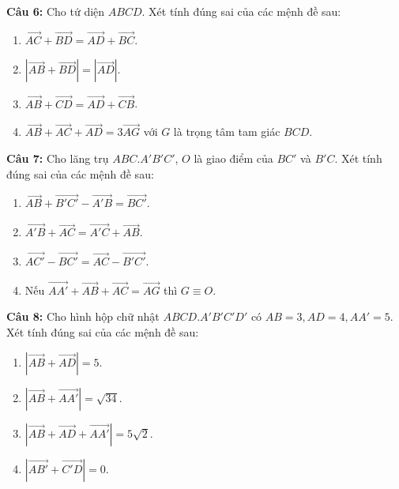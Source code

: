 \documentclass[12pt]{article}
\begin{document}
	\vspace{0.2cm}
	\noindent \textbf{Câu 6:} Cho tứ diện $ABCD$. Xét tính đúng sai của các mệnh đề sau:
	\begin{enumerate}[label=\alph*)]
		\item $\overrightarrow{AC} + \overrightarrow{BD} = \overrightarrow{AD} + \overrightarrow{BC}$.
		\item $|\overrightarrow{AB} + \overrightarrow{BD}| = |\overrightarrow{AD}|$.
		\item $\overrightarrow{AB} + \overrightarrow{CD} = \overrightarrow{AD} + \overrightarrow{CB}$.
		\item $\overrightarrow{AB} + \overrightarrow{AC} + \overrightarrow{AD} = 3\overrightarrow{AG}$ với $G$ là trọng tâm tam giác $BCD$.
	\end{enumerate}
	
	\vspace{0.2cm}
	\noindent \textbf{Câu 7:} Cho lăng trụ $ABC.A'B'C'$, $O$ là giao điểm của $BC'$ và $B'C$. Xét tính đúng sai của các mệnh đề sau:
	\begin{enumerate}[label=\alph*)]
		\item $\overrightarrow{AB} + \overrightarrow{B'C'} - \overrightarrow{A'B} = \overrightarrow{BC'}$.
		\item $\overrightarrow{A'B} + \overrightarrow{AC} = \overrightarrow{A'C} + \overrightarrow{AB}$.
		\item $\overrightarrow{AC'} - \overrightarrow{BC'} = \overrightarrow{AC} - \overrightarrow{B'C'}$.
		\item Nếu $\overrightarrow{AA'} + \overrightarrow{AB} + \overrightarrow{AC} = \overrightarrow{AG}$ thì $G \equiv O$.
	\end{enumerate}
	
	\vspace{0.2cm}
	\noindent \textbf{Câu 8:} Cho hình hộp chữ nhật $ABCD.A'B'C'D'$ có $AB = 3, AD = 4, AA' = 5$. Xét tính đúng sai của các mệnh đề sau:
	\begin{enumerate}[label=\alph*)]
		\item $|\overrightarrow{AB} + \overrightarrow{AD}| = 5$.
		\item $|\overrightarrow{AB} + \overrightarrow{AA'}| = \sqrt{34}$.
		\item $|\overrightarrow{AB} + \overrightarrow{AD} + \overrightarrow{AA'}| = 5\sqrt{2}$.
		\item $|\overrightarrow{AB'} + \overrightarrow{C'D}| = 0$.
	\end{enumerate}
	
\end{document}
